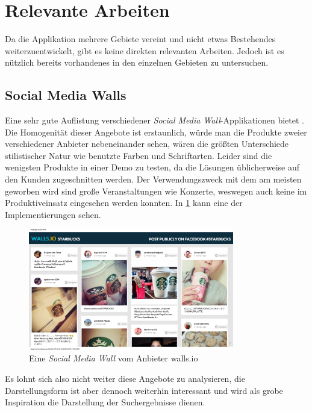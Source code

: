 \documentclass[12pt,twoside]{book}
\begin{document}
\section{Relevante Arbeiten}

Da die Applikation mehrere Gebiete vereint und nicht etwas Bestehendes weiterzuentwickelt, gibt es keine direkten relevanten Arbeiten. Jedoch ist es nützlich bereits vorhandenes in den einzelnen Gebieten zu untersuchen.

\subsection{Social Media Walls}

Eine sehr gute Auflistung verschiedener \textit{Social Media Wall}-Applikationen bietet \citep{hofram}. Die Homogenität dieser Angebote ist erstaunlich, würde man die Produkte zweier verschiedener Anbieter nebeneinander sehen, wären die größten Unterschiede stilistischer Natur wie benutzte Farben und Schriftarten. Leider sind die wenigsten Produkte in einer Demo zu testen, da die Lösungen üblicherweise auf den Kunden zugeschnitten werden. Der Verwendungszweck mit dem am meisten geworben wird sind große Veranstaltungen wie Konzerte, weswegen auch keine im Produktiveinsatz eingesehen werden konnten. In \ref{fig:socialwall} kann eine der Implementierungen sehen.\\

\begin{figure}[h]
    \centering
    \includegraphics[width=0.8\textwidth]{images/Starbucks.png}
    \caption{Eine \textit{Social Media Wall} vom Anbieter walls.io \cite{wallsio}}
    \label{fig:socialwall}
\end{figure}

Es lohnt sich also nicht weiter diese Angebote zu analysieren, die Darstellungsform ist aber dennoch weiterhin interessant und wird als grobe Inspiration die Darstellung der Suchergebnisse dienen.
\end{document}
